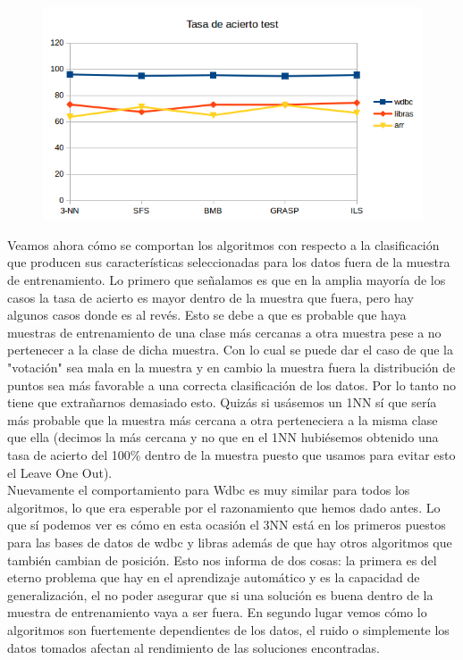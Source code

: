\documentclass[10pt,a4paper]{article}
\begin{document}
\begin{figure}[H]
\centering
\includegraphics[width=130mm]{tasa_test.png}
\end{figure}

Veamos ahora cómo se comportan los algoritmos con respecto a la clasificación que producen sus características seleccionadas para los datos fuera de la muestra de entrenamiento. Lo primero que señalamos es que en la amplia mayoría de los casos la tasa de acierto es mayor dentro de la muestra que fuera, pero hay algunos casos donde es al revés. Esto se debe a que es probable que haya muestras de entrenamiento de una clase más cercanas a otra muestra pese a no pertenecer a la clase de dicha muestra. Con lo cual se puede dar el caso de que la "votación" sea mala en la muestra y en cambio la muestra fuera la distribución de puntos sea más favorable a una correcta clasificación de los datos. Por lo tanto no tiene que extrañarnos demasiado esto. Quizás si usásemos un 1NN sí que sería más probable que la muestra más cercana a otra perteneciera a la misma clase que ella (decimos la más cercana y no que en el 1NN hubiésemos obtenido una tasa de acierto del 100\% dentro de la muestra puesto que usamos para evitar esto el Leave One Out).\\

Nuevamente el comportamiento para Wdbc es muy similar para todos los algoritmos, lo que era esperable por el razonamiento que hemos dado antes. Lo que sí podemos ver es cómo en esta ocasión el 3NN está en los primeros puestos para las bases de datos de wdbc y libras además de que hay otros algoritmos que también cambian de posición. Esto nos informa de dos cosas: la primera es del eterno problema que hay en el aprendizaje automático y es la capacidad de generalización, el no poder asegurar que si una solución es buena dentro de la muestra de entrenamiento vaya a ser fuera. En segundo lugar vemos cómo lo algoritmos son fuertemente dependientes de los datos, el ruido o simplemente los datos tomados afectan al rendimiento de las soluciones encontradas.\\
\end{document}
